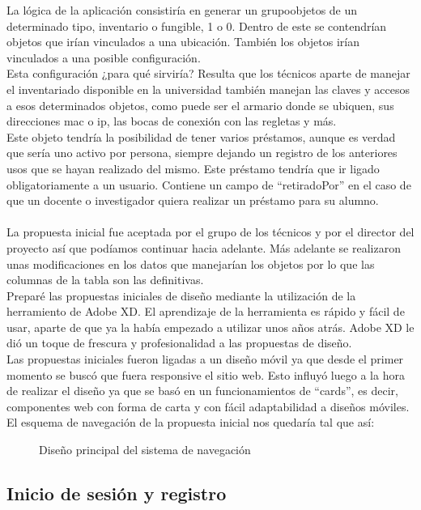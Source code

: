 La lógica de la aplicación consistiría en generar un grupoobjetos de un determinado tipo, inventario o fungible, 1 o 0. Dentro de este se contendrían objetos que irían vinculados a una ubicación. También los objetos irían vinculados a una posible configuración.
\\Esta configuración ¿para qué sirviría? Resulta que los técnicos aparte de manejar el inventariado disponible en la universidad también manejan las claves y accesos a esos determinados objetos, como puede ser el armario donde se ubiquen, sus direcciones mac o ip, las bocas de conexión con las regletas y más.
\\Este objeto tendría la posibilidad de tener varios préstamos, aunque es verdad que sería uno activo por persona, siempre dejando un registro de los anteriores usos que se hayan realizado del mismo. Este préstamo tendría que ir ligado obligatoriamente a un usuario. Contiene un campo de ``retiradoPor'' en el caso de que un docente o investigador quiera realizar un préstamo para su alumno.
\\\\La propuesta inicial fue aceptada por el grupo de los técnicos y por el director del proyecto así que podíamos continuar hacia adelante. Más adelante se realizaron unas modificaciones en los datos que manejarían los objetos por lo que las columnas de la tabla son las definitivas.
\\Preparé las propuestas iniciales de diseño mediante la utilización de la herramiento de Adobe XD. El aprendizaje de la herramienta es rápido y fácil de usar, aparte de que ya la había empezado a utilizar unos años atrás. Adobe XD le dió un toque de frescura y profesionalidad a las propuestas de diseño.
\\Las propuestas iniciales fueron ligadas a un diseño móvil ya que desde el primer momento se buscó que fuera responsive el sitio web. Esto influyó luego a la hora de realizar el diseño ya que se basó en un funcionamientos de ``cards'', es decir, componentes web con forma de carta y con fácil adaptabilidad a diseños móviles.
\\El esquema de navegación de la propuesta inicial nos quedaría tal que así:

\begin{figure}
    \caption{Diseño principal del sistema de navegación}
\end{figure}

\subsection{Inicio de sesión y registro}

